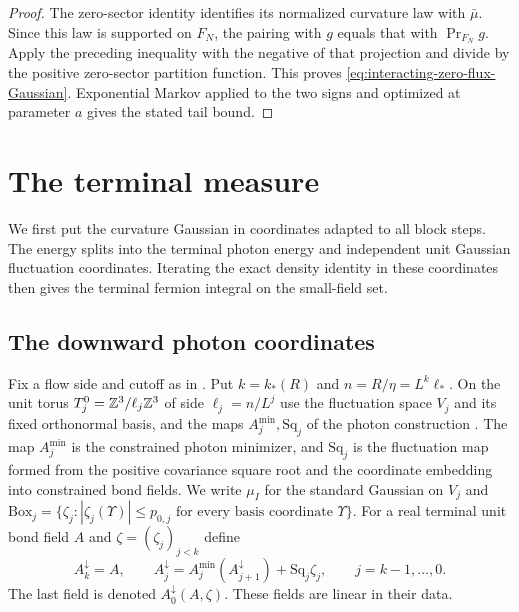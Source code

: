 \begin{proof}
The zero-sector identity
\cite[(34)]{ReferenceResponse} identifies its
normalized curvature law with $\bar\mu$.
Since this law is supported on $F_N$,
the pairing with $g$ equals that with
$\operatorname{Pr}_{F_N}g$. Apply the
preceding inequality with the negative of
that projection and divide by the positive
zero-sector partition function. This proves
\eqref{eq:interacting-zero-flux-Gaussian}.
Exponential Markov applied to the two
signs and optimized at parameter $a$
gives the stated tail bound.
\end{proof}


\section{The terminal measure}
\label{sec:terminal-partition}

We first put the curvature Gaussian in coordinates
adapted to all block steps. The energy splits into
the terminal photon energy and independent unit
Gaussian fluctuation coordinates. Iterating the exact
density identity in these coordinates then gives
the terminal fermion integral on the small-field set.

\subsection{The downward photon coordinates}
\label{subsec:term-photon-tower}

Fix a flow side and cutoff as in
\cite[Proposition~6.1]{CoverTuning}. Put $k=k_*(R)$ and
$n=R/\eta=L^k\ell_*$.
On the unit torus $T_j^0=\mathbb Z^3/\ell_j\mathbb Z^3$ of side
$\ell_j=n/L^j$ use the
fluctuation space $V_j$ and its fixed orthonormal
basis, and the maps $A_j^{\min},\mathrm{Sq}_j$ of
the photon construction \cite[\S3.2--3.3]{MaxwellBlock}.
The map $A_j^{\min}$ is the constrained photon minimizer,
and $\mathrm{Sq}_j$ is the fluctuation map formed from the
positive covariance square root and the coordinate embedding
into constrained bond fields. We write $\mu_I$ for the standard Gaussian
on $V_j$ and
$\mathrm{Box}_j=\{\zeta_j:|\zeta_j(\Upsilon)|\le p_{0,j}
\text{ for every basis coordinate }\Upsilon\}$.
For a real terminal unit bond field $A$ and
$\zeta=(\zeta_j)_{j<k}$ define
\begin{equation}\label{eq:term-downward-recursion}
 A_k^\downarrow=A,\qquad
 A_j^\downarrow=A_j^{\min}(A_{j+1}^\downarrow)
                         +\mathrm{Sq}_j\zeta_j,\qquad j=k-1,\ldots,0 .
\end{equation}
The last field is denoted $A_0^\downarrow(A,\zeta)$.
These fields are linear in their data.

